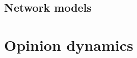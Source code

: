 \documentclass[11 pt , letterpaper , twoside , openright]{book}
\begin{document}
\cite{Albert2002} %


\section{Network models}

\chapter{Opinion dynamics}


\newpage

\end{document}
